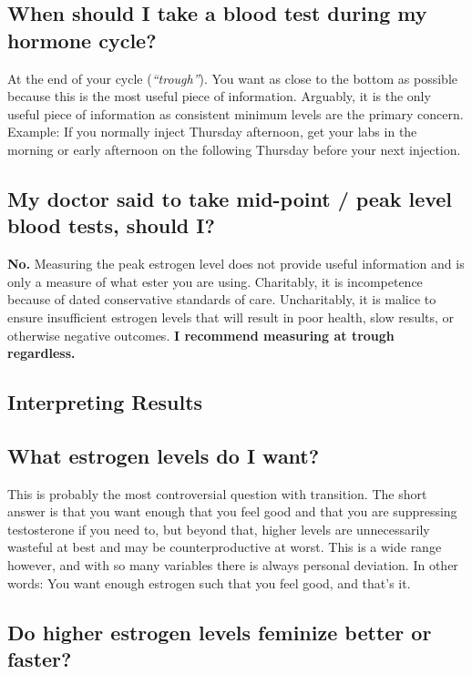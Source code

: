 \documentclass{article}
\begin{document}
\subsection{When should I take a blood test during my hormone cycle?}

At the end of your cycle (\textit{“trough”}). You want as close to the bottom as possible because this is the most useful piece of information. Arguably, it is the only useful piece of information as consistent minimum levels are the primary concern. Example: If you normally inject Thursday afternoon, get your labs in the morning or early afternoon on the following Thursday before your next injection.

\subsection{My doctor said to take mid-point / peak level blood tests, should I?}

\textbf{No.} Measuring the peak estrogen level does not provide useful information and is only a measure of what ester you are using. Charitably, it is incompetence because of dated conservative standards of care. Uncharitably, it is malice to ensure insufficient estrogen levels that will result in poor health, slow results, or otherwise negative outcomes. \textbf{I recommend measuring at trough regardless.}

\subsection*{Interpreting Results}

\subsection{What estrogen levels do I want?}

This is probably the most controversial question with transition. The short answer is that you want enough that you feel good and that you are suppressing testosterone if you need to, but beyond that, higher levels are unnecessarily wasteful at best and may be counterproductive at worst. This is a wide range however, and with so many variables there is always personal deviation. In other words: You want enough estrogen such that you feel good, and that’s it.

\subsection{Do higher estrogen levels feminize better or faster?}
\end{document}
